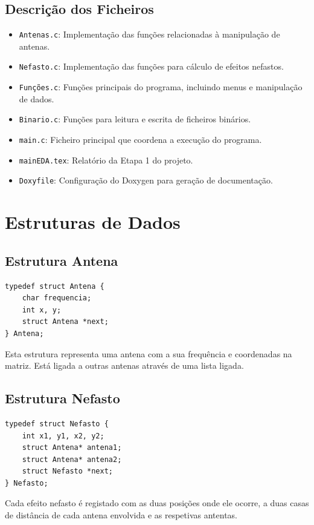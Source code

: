 \documentclass[a4paper,12pt]{report}
\begin{document}
\section{Descrição dos Ficheiros}
\begin{itemize}
    \item \texttt{Antenas.c}: Implementação das funções relacionadas à manipulação de antenas.
    \item \texttt{Nefasto.c}: Implementação das funções para cálculo de efeitos nefastos.
    \item \texttt{Funções.c}: Funções principais do programa, incluindo menus e manipulação de dados.
    \item \texttt{Binario.c}: Funções para leitura e escrita de ficheiros binários.
    \item \texttt{main.c}: Ficheiro principal que coordena a execução do programa.
    \item \texttt{mainEDA.tex}: Relatório da Etapa 1 do projeto.
    \item \texttt{Doxyfile}: Configuração do Doxygen para geração de documentação.
\end{itemize}

\chapter{Estruturas de Dados}
\section{Estrutura Antena}
\begin{lstlisting}[style=CStyle]
typedef struct Antena {
    char frequencia;
    int x, y;
    struct Antena *next;
} Antena;
\end{lstlisting}
Esta estrutura representa uma antena com a sua frequência e coordenadas na matriz. Está ligada a outras antenas através de uma lista ligada.

\section{Estrutura Nefasto}
\begin{lstlisting}[style=CStyle]
typedef struct Nefasto {
    int x1, y1, x2, y2;
    struct Antena* antena1;
    struct Antena* antena2; 
    struct Nefasto *next;
} Nefasto;
\end{lstlisting}
Cada efeito nefasto é registado com as duas posições onde ele ocorre, a duas casas de distância de cada antena envolvida e as respetivas antentas.
\end{document}
